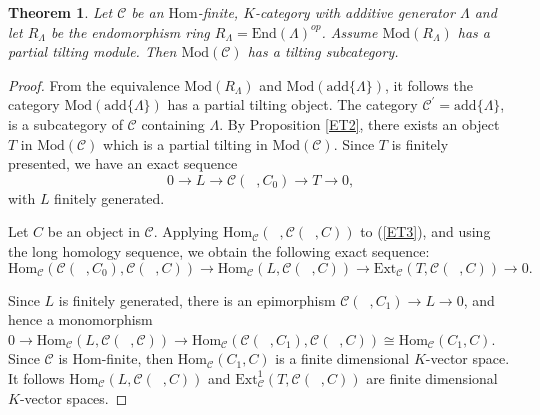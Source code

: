 \documentclass{amsart}
\newtheorem{theorem}{Theorem}
\theoremstyle{plain}
\numberwithin{equation}{section}
\begin{document}
\begin{theorem}
Let $\mathcal{C}$ be an $\mathrm{Hom}$-finite, $K$-category with additive
generator $\varLambda$ and let $R_{\varLambda}$ be the endomorphism ring $R_{\varLambda}=\mathrm{End}(\varLambda)^{op}$. Assume $\mathrm{\mathrm{Mod}}(R_{\varLambda}) $ has a partial tilting module. Then $\mathrm{\mathrm{Mod}}(\mathcal{C})$ has a tilting subcategory.
\end{theorem}

\begin{proof}
From the equivalence $\mathrm{\mathrm{Mod}}(R_{\varLambda})$ and $\mathrm{\mathrm{Mod}}(\mathrm{add}\{\varLambda\})$, it follows the category $\mathrm{\mathrm{Mod}}(\mathrm{add}\{\varLambda\})$ has a partial tilting object. The
category $\mathcal{C}^{\prime }=\mathrm{add}\{\varLambda\}$, is a
subcategory of $\mathcal{C}$ containing $\varLambda$. By Proposition \ref{ET2}, there exists an object $T $ in $\mathrm{\mathrm{Mod}}(\mathcal{C})$
which is a partial tilting in $\mathrm{\mathrm{Mod}}(\mathcal{C})$. Since $T$
is finitely presented, we have an exact sequence
\begin{equation}
0\rightarrow L\rightarrow \mathcal{C}(\;\;,C_{0})\rightarrow T\rightarrow 0\text{,}  \label{ET3}
\end{equation}with $L$ finitely generated.

Let $C$ be an object in $\mathcal{C}$. Applying $\mathrm{Hom}_{\mathcal{C}}(\;\;,\mathcal{C}(\;\;,C))$ to (\ref{ET3}), and using the long homology
sequence, we obtain the following exact sequence:
\begin{equation*}
\mathrm{Hom}_{\mathcal{C}}(\mathcal{C}(\;\;,C_{0}),\mathcal{C}(\;\;,C))\rightarrow \mathrm{Hom}_{\mathcal{C}}(L,\mathcal{C}(\;\;,C))\rightarrow \mathrm{Ext}_{\mathcal{C}}(T,\mathcal{C}(\;\;,C))\rightarrow 0\text{.}
\end{equation*}

Since $L$ is finitely generated, there is an epimorphism $\mathcal{C}(\;\;,C_{1})\rightarrow L\rightarrow 0$, and hence a monomorphism $0\rightarrow \mathrm{Hom}_{\mathcal{C}}(L,\mathcal{C}(\;\;,\mathcal{C}))\rightarrow \mathrm{Hom}_{\mathcal{C}}(\mathcal{C}(\;\;,C_{1}),\mathcal{C}(\;\;,C))\cong \mathrm{Hom}_{\mathcal{C}}(C_{1},C)$. Since $\mathcal{C}$ is $\mathrm{Hom}$-finite, then $\mathrm{Hom}_{\mathcal{C}}(C_{1},C)$ is a finite
dimensional $K$-vector space. It follows $\mathrm{Hom}_{\mathcal{C}}(L,\mathcal{C}(\;\;,C))$ and $\mathrm{Ext}_{\mathcal{C}}^{1}(T,\mathcal{C}(\;\;,C))$ are finite dimensional $K$-vector spaces.


\end{proof}
\end{document}
